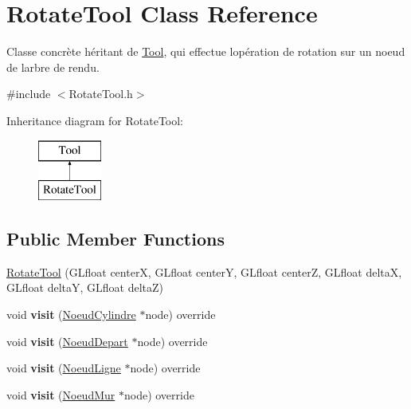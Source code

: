 \hypertarget{class_rotate_tool}{}\section{Rotate\+Tool Class Reference}
\label{class_rotate_tool}


Classe concrète héritant de \hyperlink{class_tool}{Tool}, qui effectue l\textquotesingle{}opération de rotation sur un noeud de l\textquotesingle{}arbre de rendu.  




{\ttfamily \#include $<$Rotate\+Tool.\+h$>$}

Inheritance diagram for Rotate\+Tool\+:\begin{figure}[H]
\begin{center}
\leavevmode
\includegraphics[height=2.000000cm]{class_rotate_tool}
\end{center}
\end{figure}
\subsection*{Public Member Functions}
\begin{DoxyCompactItemize}
\item 
\hyperlink{group__inf2990_ga53087375f63f0e400fdd0bf569e90ad0}{Rotate\+Tool} (G\+Lfloat center\+X, G\+Lfloat center\+Y, G\+Lfloat center\+Z, G\+Lfloat delta\+X, G\+Lfloat delta\+Y, G\+Lfloat delta\+Z)
\item 
\hypertarget{group__inf2990_ga4142a7bdd90761c6dbda240a3fe62b5d}{}void {\bfseries visit} (\hyperlink{class_noeud_cylindre}{Noeud\+Cylindre} $\ast$node) override\label{group__inf2990_ga4142a7bdd90761c6dbda240a3fe62b5d}

\item 
\hypertarget{group__inf2990_ga9649bf652069731e900bb850bd3f8475}{}void {\bfseries visit} (\hyperlink{class_noeud_depart}{Noeud\+Depart} $\ast$node) override\label{group__inf2990_ga9649bf652069731e900bb850bd3f8475}

\item 
\hypertarget{group__inf2990_gaf071f2f4b15f734f64eb917fa29f2be7}{}void {\bfseries visit} (\hyperlink{class_noeud_ligne}{Noeud\+Ligne} $\ast$node) override\label{group__inf2990_gaf071f2f4b15f734f64eb917fa29f2be7}

\item 
\hypertarget{group__inf2990_gaa3542aa6a6a3f763a133b4003d30c41f}{}void {\bfseries visit} (\hyperlink{class_noeud_mur}{Noeud\+Mur} $\ast$node) override\label{group__inf2990_gaa3542aa6a6a3f763a133b4003d30c41f}

\end{DoxyCompactItemize}
